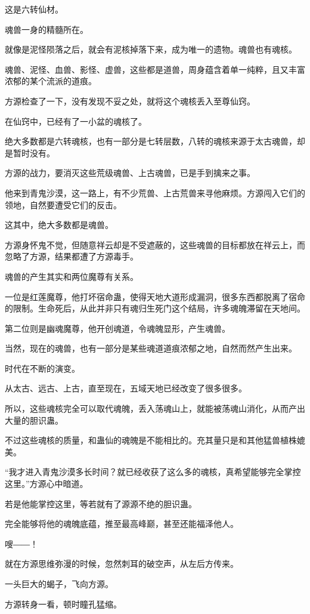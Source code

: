 \begin{this_body}
这是六转仙材。

魂兽一身的精髓所在。

就像是泥怪陨落之后，就会有泥核掉落下来，成为唯一的遗物。魂兽也有魂核。

魂兽、泥怪、血兽、影怪、虚兽，这些都是道兽，周身蕴含着单一纯粹，且又丰富浓郁的某个流派的道痕。

方源检查了一下，没有发现不妥之处，就将这个魂核丢入至尊仙窍。

在仙窍中，已经有了一小盆的魂核了。

绝大多数都是六转魂核，也有一部分是七转层数，八转的魂核来源于太古魂兽，却是暂时没有。

方源的战力，要消灭这些荒级魂兽、上古魂兽，已是手到擒来之事。

他来到青鬼沙漠，这一路上，有不少荒兽、上古荒兽来寻他麻烦。方源闯入它们的领地，自然要遭受它们的反击。

这其中，绝大多数都是魂兽。

方源身怀鬼不觉，但随意祥云却是不受遮蔽的，这些魂兽的目标都放在祥云上，而忽略了方源，结果都遭了方源毒手。

魂兽的产生其实和两位魔尊有关系。

一位是红莲魔尊，他打坏宿命蛊，使得天地大道形成漏洞，很多东西都脱离了宿命的限制。生命死后，从此并非只有魂归生死门这个结局，许多魂魄滞留在天地间。

第二位则是幽魂魔尊，他开创魂道，令魂魄显形，产生魂兽。

当然，现在的魂兽，也有一部分是某些魂道道痕浓郁之地，自然而然产生出来。

时代在不断的演变。

从太古、远古、上古，直至现在，五域天地已经改变了很多很多。

所以，这些魂核完全可以取代魂魄，丢入荡魂山上，就能被荡魂山消化，从而产出大量的胆识蛊。

不过这些魂核的质量，和蛊仙的魂魄是不能相比的。充其量只是和其他猛兽植株媲美。

“我才进入青鬼沙漠多长时间？就已经收获了这么多的魂核，真希望能够完全掌控这里。”方源心中暗道。

若是他能掌控这里，等若就有了源源不绝的胆识蛊。

完全能够将他的魂魄底蕴，推至最高峰巅，甚至还能福泽他人。

嗖――！

就在方源思维弥漫的时候，忽然刺耳的破空声，从左后方传来。

一头巨大的蝎子，飞向方源。

方源转身一看，顿时瞳孔猛缩。


\end{this_body}
